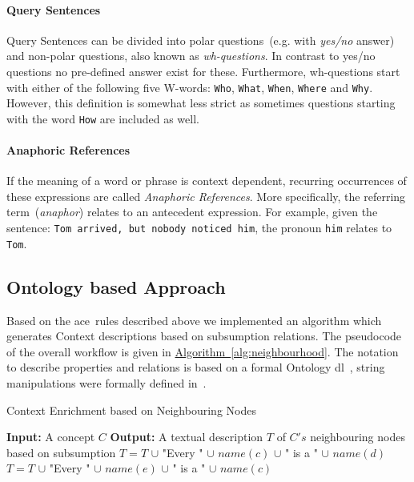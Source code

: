 \paragraph{Query Sentences} Query Sentences can be divided into polar questions~(e.g. with \textit{yes/no} answer) and non-polar questions, also known as \emph{wh-questions}. In contrast to yes/no questions no pre-defined answer exist for these. Furthermore, wh-questions start with either of the following five W-words: \texttt{Who}, \texttt{What}, \texttt{When}, \texttt{Where} and \texttt{Why}. However, this definition is somewhat less strict as sometimes questions starting with the word \texttt{How} are included as well.

\paragraph{Anaphoric References} If the meaning of a word or phrase is context dependent, recurring occurrences of these expressions are called \textit{Anaphoric References}. More specifically, the referring term~(\textit{anaphor}) relates to an antecedent expression. For example, given the sentence: \texttt{Tom arrived, but nobody noticed him}, the pronoun \texttt{him} relates to \texttt{Tom}. 

\subsection{Ontology based Approach}\label{sec:enrichment_ontology_approach}
Based on the \gls{ace}~rules described above we implemented an algorithm which generates Context descriptions based on subsumption relations. The pseudocode of the overall workflow is given in \hyperref[alg:neighbourhood]{Algorithm~\ref*{alg:neighbourhood}}. The notation to describe properties and relations is based on a formal Ontology \gls{dl}~\cite{baader2003}, string manipulations were formally defined in~\cite{hopcroft1969}.

\begin{algorithm}
	\caption{Context Enrichment based on Neighbouring Nodes}\label{alg:neighbourhood}
	\begin{algorithmic}[1]
		\newline
			\textbf{Input:} A concept $C$\newline
			\textbf{Output:} A textual description $T$ of $C's$ neighbouring nodes based on subsumption\newline
			 \label{alg:neighbourhood:text_initialisation}
				\State $T=T$ $\cup$ "Every " $\cup$ $name(c)$ $\cup$ " is a " $\cup$ $name(d)$
			\EndFor
				\State $T=T$ $\cup$ "Every " $\cup$ $name(e)$ $\cup$ " is a " $\cup$ $name(c)$
			\EndFor
		\EndProcedure
	\end{algorithmic}
\end{algorithm}

